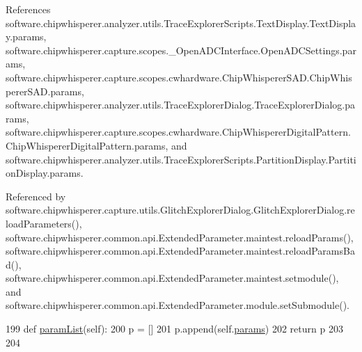 References software.\+chipwhisperer.\+analyzer.\+utils.\+Trace\+Explorer\+Scripts.\+Text\+Display.\+Text\+Display.\+params, software.\+chipwhisperer.\+capture.\+scopes.\+\_\+\+Open\+A\+D\+C\+Interface.\+Open\+A\+D\+C\+Settings.\+params, software.\+chipwhisperer.\+capture.\+scopes.\+cwhardware.\+Chip\+Whisperer\+S\+A\+D.\+Chip\+Whisperer\+S\+A\+D.\+params, software.\+chipwhisperer.\+analyzer.\+utils.\+Trace\+Explorer\+Dialog.\+Trace\+Explorer\+Dialog.\+params, software.\+chipwhisperer.\+capture.\+scopes.\+cwhardware.\+Chip\+Whisperer\+Digital\+Pattern.\+Chip\+Whisperer\+Digital\+Pattern.\+params, and software.\+chipwhisperer.\+analyzer.\+utils.\+Trace\+Explorer\+Scripts.\+Partition\+Display.\+Partition\+Display.\+params.



Referenced by software.\+chipwhisperer.\+capture.\+utils.\+Glitch\+Explorer\+Dialog.\+Glitch\+Explorer\+Dialog.\+reload\+Parameters(), software.\+chipwhisperer.\+common.\+api.\+Extended\+Parameter.\+maintest.\+reload\+Params(), software.\+chipwhisperer.\+common.\+api.\+Extended\+Parameter.\+maintest.\+reload\+Params\+Bad(), software.\+chipwhisperer.\+common.\+api.\+Extended\+Parameter.\+maintest.\+setmodule(), and software.\+chipwhisperer.\+common.\+api.\+Extended\+Parameter.\+module.\+set\+Submodule().


\begin{DoxyCode}
199     \textcolor{keyword}{def }\hyperlink{classsoftware_1_1chipwhisperer_1_1capture_1_1scopes_1_1cwhardware_1_1ChipWhispererSAD_1_1ChipWhispererSAD_a14e0dea7a5fff12a4eb25e7de6b0e8af}{paramList}(self):
200         p = []
201         p.append(self.\hyperlink{classsoftware_1_1chipwhisperer_1_1capture_1_1scopes_1_1cwhardware_1_1ChipWhispererSAD_1_1ChipWhispererSAD_afdf134d2123831254fd38ff0bd1839c3}{params})            
202         \textcolor{keywordflow}{return} p
203     
204 \end{DoxyCode}
\hypertarget{classsoftware_1_1chipwhisperer_1_1capture_1_1scopes_1_1cwhardware_1_1ChipWhispererSAD_1_1ChipWhispererSAD_a156e4e9459b32feec89466f07c8f81aa}{}
